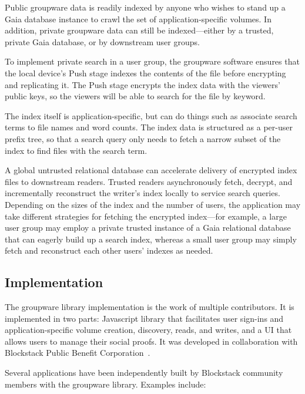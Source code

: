 Public groupware data is readily indexed by anyone who wishes to stand up a
Gaia database instance to crawl the set of application-specific
volumes. In addition, private groupware data can still be indexed---either by a
trusted, private Gaia database, or by downstream user groups.

To implement private search in a user group,
the groupware software ensures that the local device's Push
stage indexes the contents of the file before encrypting and replicating it.
The Push stage encrypts the index data with the viewers' public keys, so
the viewers will be able to search for the file by keyword.

The index itself is application-specific, but can do things such as
associate search terms to file names and word counts.
The index data is structured as a per-user prefix tree, so
that a search query only needs to fetch a narrow subset of the index to find
files with the search term.

A global untrusted relational database can accelerate delivery of encrypted
index files to downstream readers.  Trusted readers asynchronously fetch,
decrypt, and incrementally reconstruct the writer's index locally to service
search queries.  Depending on the sizes of the index and the number of users,
the application may take different strategies for fetching the encrypted
index---for example, a large user group may employ a private trusted instance of
a Gaia relational database that can eagerly build up a search index, whereas a
small user group may simply fetch and reconstruct each other users' indexes as
needed.

\subsection{Implementation}

The groupware library implementation is the work of multiple contributors.
It is implemented in two parts: Javascript library that facilitates user
sign-ins and application-specific volume creation, discovery, reads, and writes,
and a UI that allows users to manage their social proofs.
It was developed in collaboration with Blockstack Public Benefit Corporation~\cite{blockstack-pbc}.

Several applications have been independently built by Blockstack community members
with the groupware library.  Examples include:

